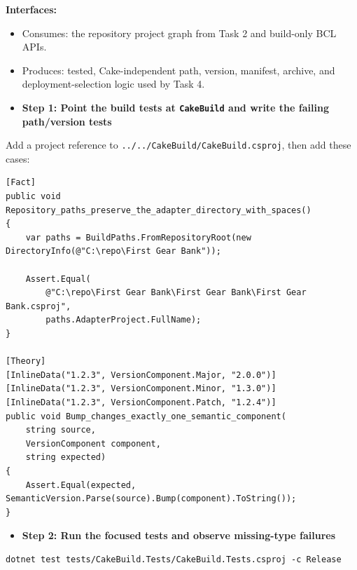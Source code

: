 \documentclass[
  10pt,
  letterpaper,
]{article}
\newcommand{\passthrough}[1]{#1}
\providecommand{\tightlist}{%
  \setlength{\itemsep}{0pt}\setlength{\parskip}{0pt}}
\begin{document}
\textbf{Interfaces:}

\begin{itemize}
\tightlist
\item
  Consumes: the repository project graph from Task 2 and build-only BCL
  APIs.
\item
  Produces: tested, Cake-independent path, version, manifest, archive,
  and deployment-selection logic used by Task 4.
\end{itemize}

\begin{itemize}
\tightlist
\item[$\square$]
  \textbf{Step 1: Point the build tests at
  \passthrough{\lstinline!CakeBuild!} and write the failing path/version
  tests}
\end{itemize}

Add a project reference to
\texttt{.}\allowbreak{}\texttt{.}\allowbreak{}\texttt{/}\allowbreak{}\texttt{.}\allowbreak{}\texttt{.}\allowbreak{}\texttt{/}\allowbreak{}\texttt{CakeBuild/}\allowbreak{}\texttt{CakeBuild.}\allowbreak{}\texttt{csproj},
then add these cases:

\begin{lstlisting}
[Fact]
public void Repository_paths_preserve_the_adapter_directory_with_spaces()
{
    var paths = BuildPaths.FromRepositoryRoot(new DirectoryInfo(@"C:\repo\First Gear Bank"));

    Assert.Equal(
        @"C:\repo\First Gear Bank\First Gear Bank\First Gear Bank.csproj",
        paths.AdapterProject.FullName);
}

[Theory]
[InlineData("1.2.3", VersionComponent.Major, "2.0.0")]
[InlineData("1.2.3", VersionComponent.Minor, "1.3.0")]
[InlineData("1.2.3", VersionComponent.Patch, "1.2.4")]
public void Bump_changes_exactly_one_semantic_component(
    string source,
    VersionComponent component,
    string expected)
{
    Assert.Equal(expected, SemanticVersion.Parse(source).Bump(component).ToString());
}
\end{lstlisting}

\begin{itemize}
\tightlist
\item[$\square$]
  \textbf{Step 2: Run the focused tests and observe missing-type
  failures}
\end{itemize}

\begin{lstlisting}
dotnet test tests/CakeBuild.Tests/CakeBuild.Tests.csproj -c Release
\end{lstlisting}
\end{document}
